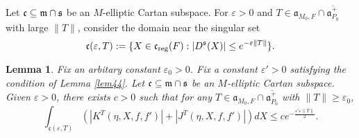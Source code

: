 \documentclass[a4paper]{amsart}
\newcommand{\fa}{{\mathfrak{a}}} \newcommand{\fb}{{\mathfrak{b}}}\newcommand{\fc}{{\mathfrak{c}}} \newcommand{\fd}{{\mathfrak{d}}}
\newcommand{\fm}{{\mathfrak{m}}} \newcommand{\fn}{{\mathfrak{n}}}\newcommand{\fo}{{\mathfrak{o}}} \newcommand{\fp}{{\mathfrak{p}}}
\newcommand{\ov}{\overline}
\newtheorem{lem}[thm]{Lemma}
\theoremstyle{definition}
\theoremstyle{remark}
\numberwithin{equation}{subsection}
\begin{document}
Let $\fc\subseteq\fm\cap\fs$ be an $M$-elliptic Cartan subspace. For $\varepsilon>0$ and $T\in\fa_{M_0,F}\cap\ov{\fa_{P_0}^+}$ with large $\|T\|$, consider the domain near the singular set
$$ \fc(\varepsilon, T):=\{X\in\fc_\reg(F): |D^\fs(X)|\leq e^{-\varepsilon\| T\|}\}. $$

\begin{lem}\label{lem43}
Fix an arbitary constant $\varepsilon_0>0$. Fix a constant $\varepsilon'>0$ satisfying the condition of Lemma \ref{lem44}. Let $\fc\subseteq\fm\cap\fs$ be an $M$-elliptic Cartan subspace. Given $\varepsilon>0$, there exists $c>0$ such that for any $T\in\fa_{M_0,F}\cap\ov{\fa_{P_0}^+}$ with $\|T\|\geq\varepsilon_0$, 
$$ \int_{\fc(\varepsilon, T)} (|K^T(\eta, X, f, f')|+|J^T(\eta, X, f, f')|) dX \leq c e^{-\frac{\varepsilon'\varepsilon\|T\|}{2}}. $$
\end{lem}
\end{document}
